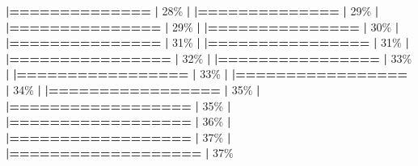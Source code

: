 \documentclass[
]{book}
\newenvironment{Shaded}{\begin{snugshade}}{\end{snugshade}}
\newcommand{\DecValTok}[1]{\textcolor[rgb]{0.00,0.00,0.81}{#1}}
\newcommand{\ErrorTok}[1]{\textcolor[rgb]{0.64,0.00,0.00}{\textbf{#1}}}
\newcommand{\NormalTok}[1]{#1}
\newcommand{\SpecialCharTok}[1]{\textcolor[rgb]{0.81,0.36,0.00}{\textbf{#1}}}
\begin{document}
\begin{Shaded}
\begin{Highlighting}[]
  \ErrorTok{|==============}                                    \ErrorTok{|}  \DecValTok{28}\NormalTok{\%}
  \SpecialCharTok{|}                                                        
  \ErrorTok{|==============}                                    \ErrorTok{|}  \DecValTok{29}\NormalTok{\%}
  \SpecialCharTok{|}                                                        
  \ErrorTok{|===============}                                   \ErrorTok{|}  \DecValTok{29}\NormalTok{\%}
  \SpecialCharTok{|}                                                        
  \ErrorTok{|===============}                                   \ErrorTok{|}  \DecValTok{30}\NormalTok{\%}
  \SpecialCharTok{|}                                                        
  \ErrorTok{|===============}                                   \ErrorTok{|}  \DecValTok{31}\NormalTok{\%}
  \SpecialCharTok{|}                                                        
  \ErrorTok{|================}                                  \ErrorTok{|}  \DecValTok{31}\NormalTok{\%}
  \SpecialCharTok{|}                                                        
  \ErrorTok{|================}                                  \ErrorTok{|}  \DecValTok{32}\NormalTok{\%}
  \SpecialCharTok{|}                                                        
  \ErrorTok{|================}                                  \ErrorTok{|}  \DecValTok{33}\NormalTok{\%}
  \SpecialCharTok{|}                                                        
  \ErrorTok{|=================}                                 \ErrorTok{|}  \DecValTok{33}\NormalTok{\%}
  \SpecialCharTok{|}                                                        
  \ErrorTok{|=================}                                 \ErrorTok{|}  \DecValTok{34}\NormalTok{\%}
  \SpecialCharTok{|}                                                        
  \ErrorTok{|=================}                                 \ErrorTok{|}  \DecValTok{35}\NormalTok{\%}
  \SpecialCharTok{|}                                                        
  \ErrorTok{|==================}                                \ErrorTok{|}  \DecValTok{35}\NormalTok{\%}
  \SpecialCharTok{|}                                                        
  \ErrorTok{|==================}                                \ErrorTok{|}  \DecValTok{36}\NormalTok{\%}
  \SpecialCharTok{|}                                                        
  \ErrorTok{|==================}                                \ErrorTok{|}  \DecValTok{37}\NormalTok{\%}
  \SpecialCharTok{|}                                                        
  \ErrorTok{|===================}                               \ErrorTok{|}  \DecValTok{37}\NormalTok{\%}

\end{Highlighting}
\end{Shaded}
\end{document}
